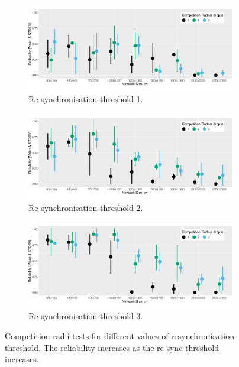 \begin{figure}[H]
\centering
\begin{subfigure}{\textwidth}
    \centering
    \includegraphics[width=\textwidth, keepaspectratio]{figure/Results/ParameterEvaluation/ResyncThreshold1_Reliability.pdf}
    \caption{Re-synchronisation threshold 1.}
    \label{subfig:resync-treshold-1}
\end{subfigure}
\begin{subfigure}{\textwidth}
    \centering
    \includegraphics[width=\textwidth, keepaspectratio]{figure/Results/ParameterEvaluation/ResyncThreshold2_Reliability.pdf}
    \caption{Re-synchronisation threshold 2.}
    \label{subfig:resync-treshold-2}
\end{subfigure}
\begin{subfigure}{\textwidth}
    \centering
    \includegraphics[width=\textwidth, keepaspectratio]{figure/Results/ParameterEvaluation/ResyncThreshold3_Reliability.pdf}
    \caption{Re-synchronisation threshold 3.}
    \label{subfig:resync-treshold-3}
\end{subfigure}

    \caption{Competition radii tests for different values of resynchronisation threshold. The reliability increases as the re-sync threshold increases.}
    \label{fig:resync-treshold-tests}
\end{figure}

